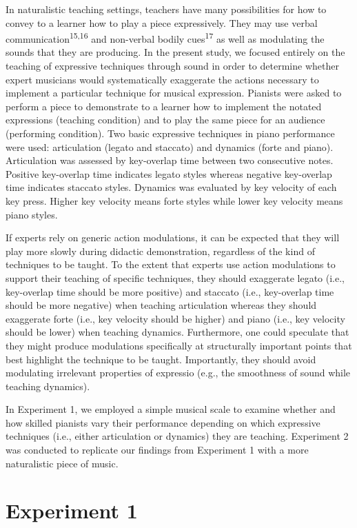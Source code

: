 \documentclass[
  man,floatsintext]{apa6}
\begin{document}
In naturalistic teaching settings, teachers have many possibilities for how to convey to a learner how to play a piece expressively. They may use verbal communication\textsuperscript{15,16} and non-verbal bodily cues\textsuperscript{17} as well as modulating the sounds that they are producing. In the present study, we focused entirely on the teaching of expressive techniques through sound in order to determine whether expert musicians would systematically exaggerate the actions necessary to implement a particular technique for musical expression. Pianists were asked to perform a piece to demonstrate to a learner how to implement the notated expressions (teaching condition) and to play the same piece for an audience (performing condition). Two basic expressive techniques in piano performance were used: articulation (legato and staccato) and dynamics (forte and piano). Articulation was assessed by key-overlap time between two consecutive notes. Positive key-overlap time indicates legato styles whereas negative key-overlap time indicates staccato styles. Dynamics was evaluated by key velocity of each key press. Higher key velocity means forte styles while lower key velocity means piano styles.

If experts rely on generic action modulations, it can be expected that they will play more slowly during didactic demonstration, regardless of the kind of techniques to be taught. To the extent that experts use action modulations to support their teaching of specific techniques, they should exaggerate legato (i.e., key-overlap time should be more positive) and staccato (i.e., key-overlap time should be more negative) when teaching articulation whereas they should exaggerate forte (i.e., key velocity should be higher) and piano (i.e., key velocity should be lower) when teaching dynamics. Furthermore, one could speculate that they might produce modulations specifically at structurally important points that best highlight the technique to be taught. Importantly, they should avoid modulating irrelevant properties of expressio (e.g., the smoothness of sound while teaching dynamics).

In Experiment 1, we employed a simple musical scale to examine whether and how skilled pianists vary their performance depending on which expressive techniques (i.e., either articulation or dynamics) they are teaching. Experiment 2 was conducted to replicate our findings from Experiment 1 with a more naturalistic piece of music.

\hypertarget{experiment-1}{%
\section{Experiment 1}\label{experiment-1}}
\end{document}
